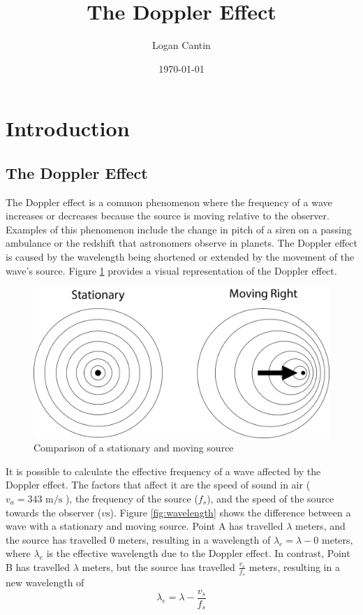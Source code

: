 \documentclass[12pt]{article}
\title{The Doppler Effect}
\author{Logan Cantin}
\date{\today}
\begin{document}
\maketitle

\section{Introduction}

\subsection{The Doppler Effect}

The Doppler effect is a common phenomenon where the frequency of a wave increases
or decreases because the source is moving relative to the observer. Examples of this phenomenon include
the change in pitch of a siren on a passing ambulance or the redshift that astronomers
observe in planets. The Doppler effect is caused by the wavelength being shortened or
extended by the movement of the wave's source. Figure \ref{fig:comparison} provides a visual representation
of the Doppler effect.

\begin{figure}[H]
	\centering
	\includegraphics[width=5in]{comparison}
	\caption{Comparison of a stationary and moving source}
	\label{fig:comparison}
\end{figure}

It is possible to calculate the effective frequency of a wave affected by the Doppler effect.
The factors that affect it are the speed of sound in air ( $ v_a = 343 \text{ m/s}  $ ),
the frequency of the source ($ f_s $), and the speed of the source towards the observer 
($ v \text{s} $). Figure \ref{fig:wavelength} shows the difference between a wave with a stationary and 
moving source. Point A has travelled $ \lambda $ meters, and the source has 
travelled $0$ meters, resulting in a wavelength of $ \lambda _e = \lambda - 0 $ meters,
where $ \lambda _e $ is the effective wavelength due to the Doppler effect.
In contrast, Point B has travelled $ \lambda $ meters, but the source has travelled 
$ \frac{v_s}{f_s} $ meters, resulting in a new wavelength of $$ \lambda _e =  \lambda - \frac{v_s}{f_s} $$
\end{document}
